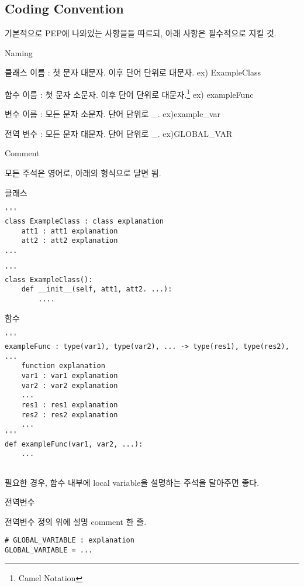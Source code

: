 \documentclass[twoside]{article}
\begin{document}
\subsection{Coding Convention} 
기본적으로 PEP에 나와있는 사항을들 따르되, 아래 사항은 필수적으로 지킬 것. 

\begin{compactitem}

\item Naming

\begin{compactitem}
\item 클래스 이름 : 첫 문자 대문자. 이후 단어 단위로 대문자. ex) ExampleClass
\item 함수 이름 : 첫 문자 소문자. 이후 단어 단위로 대문자.\footnote{Camel Notation} ex) exampleFunc
\item 변수 이름 : 모든 문자 소문자. 단어 단위로 \_. ex)example\_var
\item 전역 변수 : 모든 문자 대문자. 단어 단위로 \_. ex)GLOBAL\_VAR
\end{compactitem}

\item Comment

모든 주석은 영어로, 아래의 형식으로 달면 됨. 
\begin{compactitem}
\item 클래스 

\begin{lstlisting}
'''
class ExampleClass : class explanation
	att1 : att1 explanation
	att2 : att2 explanation 
...

'''
class ExampleClass():
	def __init__(self, att1, att2. ...):
		....
\end{lstlisting}

\item 함수 


\begin{lstlisting}
'''
exampleFunc : type(var1), type(var2), ... -> type(res1), type(res2), ...
	function explanation 
	var1 : var1 explanation
	var2 : var2 explanation 
	...
	res1 : res1 explanation 
	res2 : res2 explanation 
	...
'''
def exampleFunc(var1, var2, ...):
	...
	
\end{lstlisting}

필요한 경우, 함수 내부에 local variable을 설명하는 주석을 달아주면 좋다. 

\item 전역변수 

전역변수 정의 위에 설명 comment 한 줄. 
\begin{lstlisting}
# GLOBAL_VARIABLE : explanation 
GLOBAL_VARIABLE = ...
\end{lstlisting}

\end{compactitem}
\end{compactitem}
\end{document}
